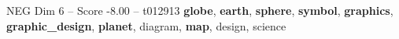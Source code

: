 \begin{textsample}{NEG Dim 6 – Score -8.00 – t012913}  \label{ex:f6_neg_037}
\textbf{globe}, \textbf{earth}, \textbf{sphere}, \textbf{symbol}, \textbf{graphics}, \textbf{graphic\_design}, \textbf{planet}, diagram, \textbf{map}, design, science

\end{textsample}
